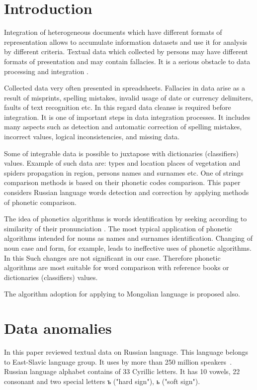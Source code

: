 \documentclass{svproc}
\begin{document}
\section{Introduction}
Integration of heterogeneous documents which have different formats of representation allows to accumulate information datasets and use it for analysis by different criteria. Textual data which collected by persons may have different formats of presentation and may contain fallacies. It is a serious obstacle to data processing and integration  \cite{Storeya-2017}.

Collected data very often presented in spreadsheets. Fallacies in data arise as a result of misprints, spelling mistakes, invalid usage of date or currency delimiters, faults of text recognition etc. In this regard data cleanse is required before integration. It is one of important steps in data integration processes. It includes many aspects such as detection and automatic correction of spelling mistakes, incorrect values, logical inconsistencies, and missing data.

Some of integrable data is possible to juxtapose with dictionaries (classifiers) values. Example of such data are: types and location places of vegetation and spiders propagation in region, persons names and surnames etc. One of strings comparison methods  is based on their phonetic codes comparison. This paper considers Russian language words detection and correction by applying methods of phonetic comparison.

The idea of phonetics algorithms is words identification by seeking according to similarity of their pronunciation \cite{Parmar-2014}. The most typical application of phonetic algorithms intended for nouns as names and surnames \cite{Zahoransky-2015} identification. Changing of noun case and form, for example, leads to ineffective uses of phonetic algorithms. In this Such changes are not significant in our case. Therefore phonetic algorithms are most suitable for word comparison with reference books or dictionaries (classifiers) values.

The algorithm adoption for applying to Mongolian language is proposed also.

\section{Data anomalies}
In this paper reviewed textual data on Russian language. This language belongs to East-Slavic language group. It uses by more than 250 million speakers~\cite{Cubberley-2002}. Russian language alphabet contains of 33 Cyrillic letters. It has 10 vowels, 22 consonant and two special letters ъ ("hard sign"), ь ("soft sign").
\end{document}
